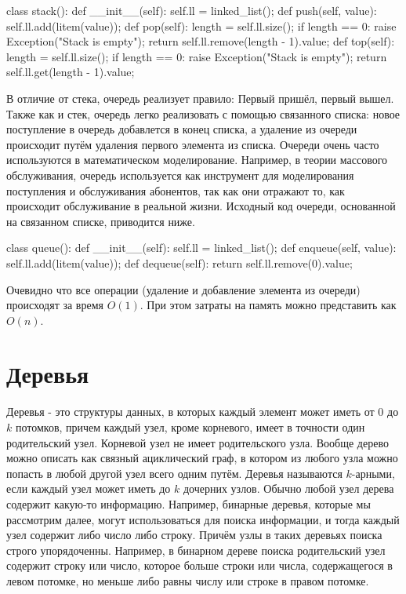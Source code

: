 \begin{python}
class stack():
	def __init__(self):
		self.ll = linked_list();
	def push(self, value):
		self.ll.add(litem(value));
	def pop(self):
		length = self.ll.size();
		if length == 0:
			raise Exception("Stack is empty");
		return self.ll.remove(length - 1).value;
	def top(self):
		length = self.ll.size();
		if length == 0:
			raise Exception("Stack is empty");
		return self.ll.get(length - 1).value;
\end{python}

В отличие от стека, очередь реализует правило: Первый пришёл, первый 
вышел. Также как и стек, очередь легко реализовать с помощью связанного
списка: новое поступление в очередь добавлется в конец списка, 
а удаление из очереди происходит путём удаления первого элемента из
списка. Очереди очень часто используются в математическом моделирование. 
Например, в теории массового обслуживания, очередь используется как 
инструмент для моделирования поступления и обслуживания абонентов, 
так как они отражают то, как происходит обслуживание в реальной жизни.
Исходный код очереди, основанной на связанном списке, приводится ниже.

\begin{python}
class queue():
	def __init__(self):
		self.ll = linked_list();
	def enqueue(self, value):
		self.ll.add(litem(value));
	def dequeue(self):
		return self.ll.remove(0).value;
\end{python}

Очевидно что все операции (удаление и добавление элемента из очереди)
происходят за время $O(1)$. При этом затраты на память можно представить 
как $O(n)$.

\section{Деревья}

Деревья - это структуры данных, в которых каждый элемент может иметь от $0$ 
до $k$ потомков, причем каждый узел, кроме корневого, имеет в точности один 
родительский узел. Корневой узел не имеет родительского узла. Вообще дерево можно
описать как связный ациклический граф, в котором из любого узла можно попасть в любой 
другой узел всего одним путём. Деревья называются $k$-арными, если каждый узел может 
иметь до $k$ дочерних узлов. Обычно любой узел дерева содержит какую-то 
информацию. Например, бинарные деревья, которые мы рассмотрим далее, могут 
использоваться для поиска информации, и тогда каждый узел содержит либо 
число либо строку. Причём узлы в таких деревьях поиска строго упорядоченны.
Например, в бинарном дереве поиска родительский узел содержит строку или число,
которое больше строки или числа, содержащегося в левом потомке, но меньше 
либо равны числу или строке в правом потомке. 

